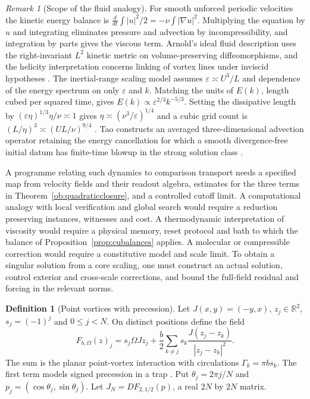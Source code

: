 \documentclass[aps,pra,onecolumn,superscriptaddress,nofootinbib,10pt]{revtex4-2}
\theoremstyle{definition}
\newtheorem{definition}[theorem]{Definition}
\theoremstyle{remark}
\newtheorem{remark}[theorem]{Remark}
\begin{document}
\begin{remark}[Scope of the fluid analogy]
\label{ob:fluidprogramme}
For smooth unforced periodic velocities the kinetic energy balance is
$\frac{d}{dt}\int |u|^2/2=-\nu\int|\nabla u|^2$.
Multiplying the equation by $u$ and integrating eliminates pressure and
advection by incompressibility, and integration by parts gives the viscous
term. Arnold's ideal fluid description uses the right-invariant $L^2$
kinetic metric on volume-preserving diffeomorphisms, and the helicity
interpretation concerns linking of vortex lines under inviscid hypotheses
\cite{obr:Arnold,obr:Moffatt}.
The inertial-range scaling model assumes $\varepsilon\asymp U^3/L$
and dependence of the energy spectrum on only $\varepsilon$ and $k$.
Matching the units of $E(k)$, length cubed per squared time, gives
$E(k)\propto\varepsilon^{2/3}k^{-5/3}$. Setting the dissipative length by $(\varepsilon\eta)^{1/3}\eta/\nu\asymp1$ gives $\eta\asymp(\nu^3/\varepsilon)^{1/4}$ and a cubic grid count is
$(L/\eta)^3\asymp(UL/\nu)^{9/4}$ \cite{obr:Kolmogorov}.
Tao constructs an averaged three-dimensional advection operator retaining
the energy cancellation for which a smooth divergence-free initial datum
has finite-time blowup in the strong solution class \cite{obr:Tao}.

A programme relating such dynamics to comparison transport needs a specified
map from velocity fields and their readout algebra, estimates for the three
terms in Theorem~\ref{ob:quadraticclosure}, and a controlled cutoff limit.
A computational analogy with local verification and global search would
require a reduction preserving instances, witnesses and cost. A
thermodynamic interpretation of viscosity would require a physical memory,
reset protocol and bath to which the balance of
Proposition~\ref{prop:cubalances} applies. A molecular or compressible
correction would require a constitutive model and scale limit. To obtain
a singular solution from a core scaling, one must construct an actual
solution, control exterior and cross-scale corrections, and bound the
full-field residual and forcing in the relevant norms.
\end{remark}

\begin{definition}[Point vortices with precession]
\label{ob:vortexdef}
Let $J(x,y)=(-y,x)$, $z_j\in\mathbb R^2$, $s_j=(-1)^j$ and $0\le j<N$.
On distinct positions define the field
\[
 F_{b,\Omega}(z)_j=s_j\Omega Jz_j+
             \frac{b}{2}\sum_{k\ne j}s_k\frac{J(z_j-z_k)}{|z_j-z_k|^2}.
\]
The sum is the planar point-vortex interaction with circulations
$\Gamma_k=\pi b s_k$. The first term models signed precession in a
trap \cite{obr:BarryKevrekidis}. Put $\theta_j=2\pi j/N$ and
$p_j=(\cos\theta_j,\sin\theta_j)$. Let $J_N=DF_{2,1/2}(p)$, a real $2N$ by $2N$ matrix.
\end{definition}
\end{document}
